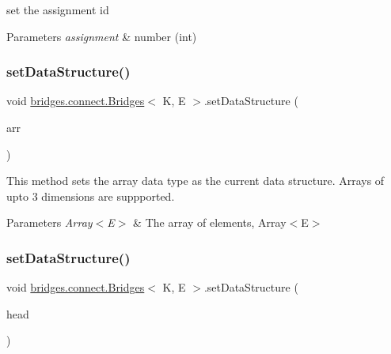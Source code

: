 set the assignment id


\begin{DoxyParams}{Parameters}
{\em assignment} & number (int) \\
\hline
\end{DoxyParams}
\hypertarget{classbridges_1_1connect_1_1_bridges_a2cd9af150b77b8337327ea67544a0e8f}{}\label{classbridges_1_1connect_1_1_bridges_a2cd9af150b77b8337327ea67544a0e8f} 
\subsubsection{\texorpdfstring{set\+Data\+Structure()}{setDataStructure()}\hspace{0.1cm}{\footnotesize\ttfamily [1/12]}}
{\footnotesize\ttfamily void \hyperlink{classbridges_1_1connect_1_1_bridges}{bridges.\+connect.\+Bridges}$<$ K, E $>$.set\+Data\+Structure (\begin{DoxyParamCaption}\item[{\hyperlink{classbridges_1_1base_1_1_array}{Array}$<$ E $>$}]{arr }\end{DoxyParamCaption})}

This method sets the array data type as the current data structure. Arrays of upto 3 dimensions are suppported.


\begin{DoxyParams}{Parameters}
{\em Array$<$\+E$>$} & The array of elements, Array$<$\+E$>$ \\
\hline
\end{DoxyParams}
\hypertarget{classbridges_1_1connect_1_1_bridges_ae41b3d86963350ace304d8951c1863ad}{}\label{classbridges_1_1connect_1_1_bridges_ae41b3d86963350ace304d8951c1863ad} 
\subsubsection{\texorpdfstring{set\+Data\+Structure()}{setDataStructure()}\hspace{0.1cm}{\footnotesize\ttfamily [2/12]}}
{\footnotesize\ttfamily void \hyperlink{classbridges_1_1connect_1_1_bridges}{bridges.\+connect.\+Bridges}$<$ K, E $>$.set\+Data\+Structure (\begin{DoxyParamCaption}\item[{\hyperlink{classbridges_1_1base_1_1_s_lelement}{S\+Lelement}$<$ E $>$}]{head }\end{DoxyParamCaption})}

